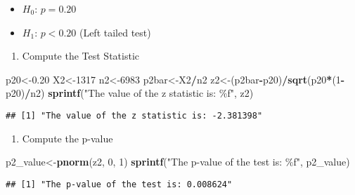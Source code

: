 \documentclass[
]{article}
\newenvironment{Shaded}{\begin{snugshade}}{\end{snugshade}}
\newcommand{\DecValTok}[1]{\textcolor[rgb]{0.00,0.00,0.81}{#1}}
\newcommand{\FloatTok}[1]{\textcolor[rgb]{0.00,0.00,0.81}{#1}}
\newcommand{\FunctionTok}[1]{\textcolor[rgb]{0.13,0.29,0.53}{\textbf{#1}}}
\newcommand{\NormalTok}[1]{#1}
\newcommand{\OtherTok}[1]{\textcolor[rgb]{0.56,0.35,0.01}{#1}}
\newcommand{\SpecialCharTok}[1]{\textcolor[rgb]{0.81,0.36,0.00}{\textbf{#1}}}
\newcommand{\StringTok}[1]{\textcolor[rgb]{0.31,0.60,0.02}{#1}}
\providecommand{\tightlist}{%
  \setlength{\itemsep}{0pt}\setlength{\parskip}{0pt}}
\begin{document}
\begin{itemize}
\tightlist
\item
  \(H_{0}\): \(p=0.20\)
\item
  \(H_{1}\): \(p<0.20\) (Left tailed test)
\end{itemize}

\begin{enumerate}
\def\labelenumi{\arabic{enumi}.}
\setcounter{enumi}{1}
\tightlist
\item
  Compute the Test Statistic
\end{enumerate}

\begin{Shaded}
\begin{Highlighting}[]
\NormalTok{p20}\OtherTok{\textless{}{-}}\FloatTok{0.20}
\NormalTok{X2}\OtherTok{\textless{}{-}}\DecValTok{1317}
\NormalTok{n2}\OtherTok{\textless{}{-}}\DecValTok{6983}
\NormalTok{p2bar}\OtherTok{\textless{}{-}}\NormalTok{X2}\SpecialCharTok{/}\NormalTok{n2}
\NormalTok{z2}\OtherTok{\textless{}{-}}\NormalTok{(p2bar}\SpecialCharTok{{-}}\NormalTok{p20)}\SpecialCharTok{/}\FunctionTok{sqrt}\NormalTok{(p20}\SpecialCharTok{*}\NormalTok{(}\DecValTok{1}\SpecialCharTok{{-}}\NormalTok{p20)}\SpecialCharTok{/}\NormalTok{n2)}
\FunctionTok{sprintf}\NormalTok{(}\StringTok{"The value of the z statistic is: \%f"}\NormalTok{, z2)}
\end{Highlighting}
\end{Shaded}

\begin{verbatim}
## [1] "The value of the z statistic is: -2.381398"
\end{verbatim}

\begin{enumerate}
\def\labelenumi{\arabic{enumi}.}
\setcounter{enumi}{2}
\tightlist
\item
  Compute the p-value
\end{enumerate}

\begin{Shaded}
\begin{Highlighting}[]
\NormalTok{p2\_value}\OtherTok{\textless{}{-}}\FunctionTok{pnorm}\NormalTok{(z2, }\DecValTok{0}\NormalTok{, }\DecValTok{1}\NormalTok{)}
\FunctionTok{sprintf}\NormalTok{(}\StringTok{"The p{-}value of the test is: \%f"}\NormalTok{, p2\_value)}
\end{Highlighting}
\end{Shaded}

\begin{verbatim}
## [1] "The p-value of the test is: 0.008624"
\end{verbatim}
\end{document}
